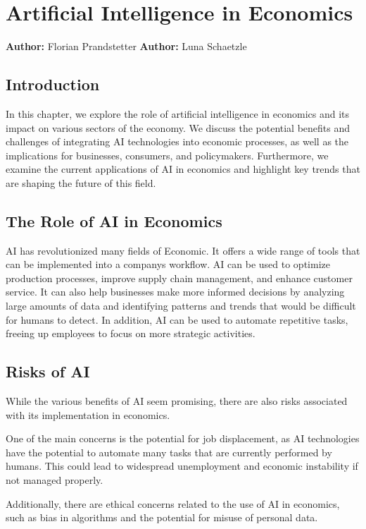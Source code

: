 \chapter{Artificial Intelligence in Economics}
\label{chap:Artificial_Intelligence_in_Economics}
\textbf{Author:} Florian Prandstetter
\textbf{Author:} Luna Schaetzle


\section{Introduction}

In this chapter, we explore the role of artificial intelligence in economics and its impact on various sectors of the economy. We discuss the potential benefits and challenges of integrating AI technologies into economic processes, as well as the implications for businesses, consumers, and policymakers. Furthermore, we examine the current applications of AI in economics and highlight key trends that are shaping the future of this field.


\section{The Role of AI in Economics}

AI has revolutionized many fields of Economic. It offers a wide range of tools that can be implemented into a companys workflow.
AI can be used to optimize production processes, improve supply chain management, and enhance customer service. It can also help businesses make more informed decisions by analyzing large amounts of data and identifying patterns and trends that would be difficult for humans to detect. In addition, AI can be used to automate repetitive tasks, freeing up employees to focus on more strategic activities.

\section{Risks of AI}

While the various benefits of AI seem promising, there are also risks associated with its implementation in economics.

One of the main concerns is the potential for job displacement, as AI technologies have the potential to automate many tasks that are currently performed by humans. This could lead to widespread unemployment and economic instability if not managed properly. 

Additionally, there are ethical concerns related to the use of AI in economics, such as bias in algorithms and the potential for misuse of personal data.

